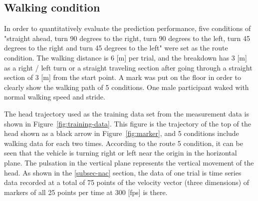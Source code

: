 \documentclass{sigchi}
\begin{document}
\subsection{Walking condition}

In order to quantitatively evaluate the prediction performance, five conditions of "straight ahead, turn 90 degrees to the right, turn 90 degrees to the left, turn 45 degrees to the right and turn 45 degrees to the left" were set as the route condition. The walking distance is 6 [m] per trial, and the breakdown has 3 [m] as a right / left turn or a straight traveling section after going through a straight section of 3 [m] from the start point. A mark was put on the floor  in order to clearly show the walking path of 5 conditions. One male participant waked with normal walking speed and stride.

The head trajectory used as the training data set from the measurement data is shown in Figure~\ref{fig:training-data}. This figure is the trajectory of the top of the head shown as a black arrow in Figure~\ref{fig:marker}, and 5 conditions include walking data for each two times. According to the route 5 condition, it can be seen that the vehicle is turning right or left near the origin in the horizontal plane. The pulsation in the vertical plane represents the vertical movement of the head. As shown in the \ref{subsec-nac} section, the data of one trial is time series data recorded at a total of 75 points of the velocity vector (three dimensions) of markers of all 25 points per time at 300 [fps] is there.


\end{document}
